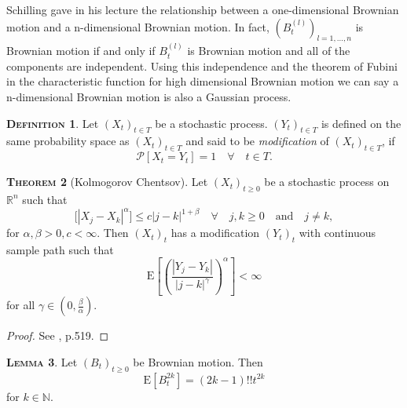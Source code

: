 \documentclass[a4paper, twoside, 11pt]{article}
\theoremstyle{definition}
\newtheorem{definition}{\scshape Definition}[section]
\newtheorem{theorem}[definition]{\scshape Theorem}
\newtheorem{lemma}[definition]{\scshape Lemma}
\begin{document}
  Schilling gave in his lecture \cite{shilling} the relationship between a one-dimensional Brownian motion and a n-dimensional Brownian motion.
  In fact, $(B_t^{(l)})_{l=1,\dots,n}$ is Brownian motion if and only if $B_t^{(l)}$ is Brownian motion and all of the components are independent. Using this independence and the theorem of Fubini in the characteristic function for high dimensional Brownian motion we can say a n-dimensional Brownian motion is also a Gaussian process.

  \begin{definition}
	Let $(X_t)_{t\in T}$  be a stochastic process. $(Y_t)_{t\in T}$ is defined on the same probability space as $(X_t)_{t\in T}$ and said to be \emph{modification} of $(X_t)_{t\in T}$, if
	\begin{equation*}
	  \mathcal{P}[X_t = Y_t] = 1 \hspace{1em} \forall \hspace{1em} t\in T.
	\end{equation*}
  \end{definition}

  \begin{theorem}[Kolmogorov Chentsov]
	 Let $(X_t)_{t \ge 0}$ be a stochastic process on $\mathbb{R}^{n}$ such that
	\begin{equation*}
	  \mathrm[|X_j - X_k|^\alpha] \le c |j - k|^{1+\beta} \hspace{1em}\forall \hspace{1em} j ,k \ge 0 \hspace{1em} \text{and} \hspace{1em} j\neq k,
	\end{equation*}
	for $\alpha, \beta > 0, c < \infty$. Then $(X_t)_t$ has a modification $(Y_t)_t$ with continuous sample path such that 
	\begin{equation*}
	  \mathrm{E}[(\frac{|Y_j - Y_k|}{|j - k|^\gamma})^\alpha] < \infty
	\end{equation*}
	for all $\gamma \in (0, \frac{\beta}{\alpha})$.
	\label{sec:kolch}
  \end{theorem}
  \begin{proof}
	See \cite{loeve}, p.519.
  \end{proof}

  \begin{lemma}
	 Let $(B_t)_{t\ge 0}$ be Brownian motion. Then
	 \begin{equation*}
	   \mathrm{E}[B_t^{2k}] = (2k - 1)!! t^{2k}
	 \end{equation*}
	 for $k \in \mathbb{N}$.
	 \label{sec:le1}
  \end{lemma}
\end{document}
